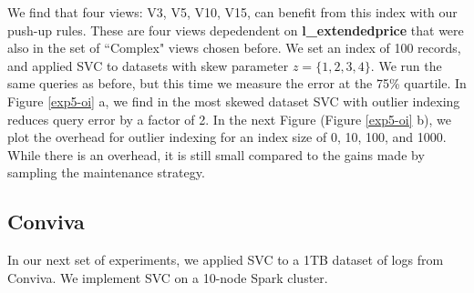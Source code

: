 We find that four views: V3, V5, V10, V15, can benefit from this index with our push-up rules. 
These are four views depedendent on \textbf{l\_extendedprice} that were also in the set of ``Complex" views chosen before.
We set an index of 100 records, and applied SVC to datasets with skew parameter $z=\{1,2,3,4\}$. 
We run the same queries as before, but this time we measure the error at the 75\% quartile.
In Figure \ref{exp5-oi} a, we find in the most skewed dataset SVC with outlier indexing reduces query error by a factor of 2.
In the next Figure (Figure \ref{exp5-oi} b), we plot the overhead for outlier indexing for an index size of 0, 10, 100, and 1000.
While there is an overhead, it is still small compared to the gains made by sampling the maintenance strategy.

\subsection{Conviva}
In our next set of experiments, we applied SVC to a 1TB dataset of logs from Conviva.
We implement SVC on a 10-node Spark cluster. 

